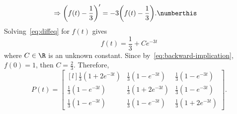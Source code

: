 \documentclass[
  coursecode={MTHE 455},
  assignmentname={Assignment \assignmentnumber},
  studentnumber=20053722,
  name={Bryan Hoang},
  draft,
]{
  ltxanswer%
}
\begin{document}
\begin{questions}
\begin{solution}
\begin{align*}
        \Rightarrow \biggl(f(t) - \frac{1}{3}\biggr)' &= -3\biggl(f(t) - \frac{1}{3}\biggr).\numberthis\label{eq:diffeq}
      \end{align*}
      Solving~\eqref{eq:diffeq} for \(f(t)\) gives
      \begin{equation*}
        f(t) = \frac{1}{3} + Ce^{-3t}
      \end{equation*}
      where \(C \in \R\) is an unknown constant. Since by~\eqref{eq:backward-implication}, \(f(0) = 1\), then \(C = \frac{2}{3}\). Therefore,
      \begin{equation*}
        \renewcommand{\arraystretch}{1.5}
        \boxed{
          P(t) = \begin{bmatrix*}[l]
            \frac{1}{3} (1 + 2e^{-3t}) & \frac{1}{3} (1 - e^{-3t})  & \frac{1}{3} (1 - e^{-3t})  \\
            \frac{1}{3} (1 - e^{-3t})  & \frac{1}{3} (1 + 2e^{-3t}) & \frac{1}{3} (1 - e^{-3t})  \\
            \frac{1}{3} (1 - e^{-3t})  & \frac{1}{3} (1 - e^{-3t})  & \frac{1}{3} (1 + 2e^{-3t})
          \end{bmatrix*}
        }.
      \end{equation*}
    \end{solution}
  \end{questions}
\end{document}
